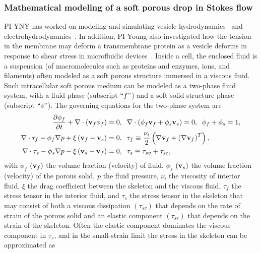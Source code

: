 \documentclass[11pt]{article}
\begin{document}
\subsubsection{Mathematical modeling of a soft porous drop in Stokes
flow} 
\label{subsubsec:math_modeling}
PI YNY has worked on modeling and simulating vesicle
hydrodynamics~\cite{Veerapaneni2011_PRL, Vlahovska2011_JFM} and
electrohydrodynamics~\cite{HuLai2016_JCP, Nganguia2013_PRE}.  In
addition, PI Young also investigated how the tension in the membrane may
deform a transmembrane protein as a vesicle deforms in response to shear
stress in microfluidic devices~\cite{Pak2015_PNAS, Peng2016_AMS}. Inside
a cell, the enclosed fluid is a suspension (of macromolecules such as
proteins and enzymes, ions, and filaments) often modeled as a soft
porous structure immersed in a viscous fluid.  Such intracellular soft
porous medium can be modeled as a two-phase fluid system, with a fluid
phase (subscript $``f"$) and a soft solid structure phase (subscript
$``s"$).  The governing equations for the two-phase system are
\begin{align}
\label{eq:geq1}
\frac{\partial \phi_f}{\partial t} + \nabla \cdot \left({\bf v}_f \phi_f\right) &= 0,\;\; \nabla \cdot \left(\phi_f {\bf v}_f + \phi_s {\bf v}_s \right) =0,\;\;\phi_f + \phi_s = 1,\\
\label{eq:geq2}
\nabla \cdot {\tau}_f -\phi_f \nabla p +\xi\left({\bf v}_f - {\bf v}_s\right) &=0,\;\; \tau_f\equiv \frac{\nu_i}{2}\left(\nabla {\bf v}_f + \left(\nabla{\bf v}_f\right)^T\right), \\
\label{eq:geq3}
\nabla \cdot {\tau}_s-\phi_s \nabla p -\xi \left({\bf v}_s - {\bf v}_f\right) &=0,\;\; \tau_s\equiv \tau_{sv}+\tau_{se},
\end{align}
with $\phi_f$ $({\bf v}_f)$ the volume fraction (velocity) of fluid,
$\phi_s$  $({\bf v}_s)$ the volume fraction (velocity) of the porous
solid, $p$ the fluid pressure, $\nu_i$ the viscosity of interior fluid,
$\xi$ the drag coefficient between the skeleton and the viscous fluid,
$\tau_f$  the stress tensor in the interior fluid, and $\tau_s$ the
stress tensor in the skeleton that may consist of both a viscous
dissipation $(\tau_{sv})$ that depends on the rate of strain of the
porous solid and an elastic component $(\tau_{se})$ that depends on the
strain of the skeleton.  Often the elastic component dominates the
viscous component in $\tau_s$,  and in the small-strain limit the stress
in the skeleton can be approximated as
\end{document}
